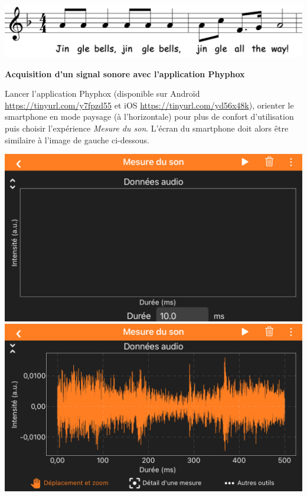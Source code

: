 \documentclass[12pt,a4paper]{article}
\begin{document}
\vfill

\begin{center}
\includegraphics[scale=0.35]{images/jingle_bells.png}
\end{center}

\newpage


\begin{doc}
\label{doc:phyphox}
\textbf{Acquisition d'un signal sonore avec l'application Phyphox}

Lancer l'application Phyphox (disponible sur Androïd \href{https://play.google.com/store/apps/details?id=de.rwth_aachen.phyphox&hl=fr&gl=US}{https://tinyurl.com/y7fpzd55} et iOS \href{https://apps.apple.com/fr/app/phyphox/id1127319693#?platform=iphone}{https://tinyurl.com/yd56x48k}), orienter le smartphone en mode paysage (à l'horizontale) pour plus de confort d'utilisation puis choisir l'expérience \emph{Mesure du son}.
L'écran du smartphone doit alors être similaire à l'image de gauche ci-dessous.

\begin{center}
\includegraphics[scale=0.2]{images/phyphox1.jpeg}
\includegraphics[scale=0.2]{images/phyphox2.jpeg}
\end{center}


\end{doc}
\end{document}
